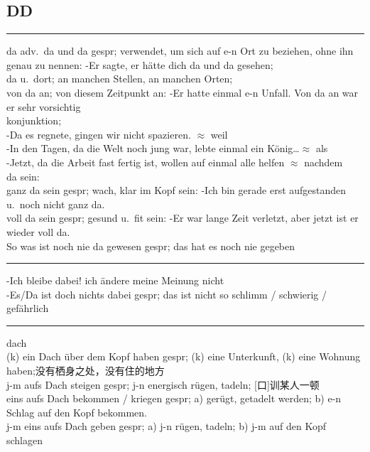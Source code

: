 \subsection{DD}
\label{app:dict:DD}
\noindent

\noindent\rule{\textwidth}{1pt}
da\newline
adv.\ 
da und da gespr; verwendet, um sich auf e-n Ort zu beziehen, ohne ihn genau zu nennen: -Er sagte, er h\"atte dich da und da gesehen;\\

\noindent
da u.\ dort; an manchen Stellen, an manchen Orten;\\

\noindent
von da an; von diesem Zeitpunkt an: -Er hatte einmal e-n Unfall. Von da an war er sehr vorsichtig\\

\noindent
konjunktion;\\
-Da es regnete, gingen wir nicht spazieren. $\approx$ weil\\
-In den Tagen, da die Welt noch jung war, lebte einmal ein K\"onig\dots $ \approx $ als\\
-Jetzt, da die Arbeit fast fertig ist, wollen auf einmal alle helfen $\approx$ nachdem\\

\noindent
da sein:\\
ganz da sein gespr; wach, klar im Kopf sein: -Ich bin gerade erst aufgestanden u.\ noch nicht ganz da.\\
voll da sein gespr; gesund u.\ fit sein: -Er war lange Zeit verletzt, aber jetzt ist er wieder voll da.\\
So was ist noch nie da gewesen gespr; das hat es noch nie gegeben\\

\noindent\rule{\textwidth}{1pt}
-Ich bleibe dabei! ich \"andere meine Meinung nicht \\
-Es/Da ist doch nichts dabei gespr; das ist nicht so schlimm / schwierig / gef\"ahrlich \\

\noindent\rule{\textwidth}{1pt}
dach \\
(k) ein Dach \"uber dem Kopf haben gespr; (k) eine Unterkunft, (k) eine Wohnung haben;没有栖身之处，没有住的地方\\
j-m aufs Dach steigen gespr; j-n energisch r\"ugen, tadeln; [口]训某人一顿\\
eins aufs Dach bekommen / kriegen gespr; a) ger\"ugt, getadelt werden; b) e-n Schlag auf den Kopf bekommen. \\
j-m eins aufs Dach geben gespr; a) j-n r\"ugen, tadeln; b) j-m auf den Kopf schlagen \\

